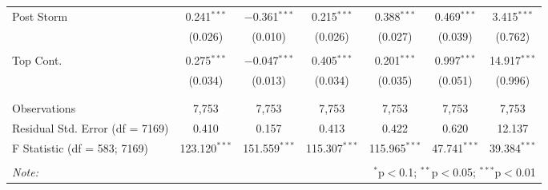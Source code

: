 \begin{table}[!htbp]
\begin{tabular}{@{\extracolsep{5pt}}lcccccc}
 Post Storm & 0.241$^{***}$ & $-$0.361$^{***}$ & 0.215$^{***}$ & 0.388$^{***}$ & 0.469$^{***}$ & 3.415$^{***}$ \\ 
  & (0.026) & (0.010) & (0.026) & (0.027) & (0.039) & (0.762) \\ 
  & & & & & & \\ 
 Top Cont. & 0.275$^{***}$ & $-$0.047$^{***}$ & 0.405$^{***}$ & 0.201$^{***}$ & 0.997$^{***}$ & 14.917$^{***}$ \\ 
  & (0.034) & (0.013) & (0.034) & (0.035) & (0.051) & (0.996) \\ 
  & & & & & & \\ 
\hline \\[-1.8ex] 
Observations & 7,753 & 7,753 & 7,753 & 7,753 & 7,753 & 7,753 \\ 
Residual Std. Error (df = 7169) & 0.410 & 0.157 & 0.413 & 0.422 & 0.620 & 12.137 \\ 
F Statistic (df = 583; 7169) & 123.120$^{***}$ & 151.559$^{***}$ & 115.307$^{***}$ & 115.965$^{***}$ & 47.741$^{***}$ & 39.384$^{***}$ \\ 
\hline 
\hline \\[-1.8ex] 
\textit{Note:}  & \multicolumn{6}{r}{$^{*}$p$<$0.1; $^{**}$p$<$0.05; $^{***}$p$<$0.01} \\ 
\end{tabular} 
\end{table} 
